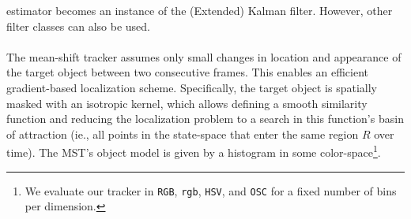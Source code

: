 \documentclass[a4paper,11pt]{article}
\begin{document}
		estimator becomes an instance of the (Extended) Kalman filter. However, other
		filter classes can also be used.
		\\ \\
		The mean-shift tracker assumes only small changes in location and appearance
		of the target object between two consecutive frames. This enables an efficient
		gradient-based localization scheme. Specifically, the target object is spatially
		masked with an isotropic kernel, which allows defining a smooth similarity function
		and reducing the localization problem to a search in this function's basin of attraction
		(ie., all points in the state-space that enter the same region $R$ over time). The MST's
		object model is given by a histogram in some color-space\footnote{We evaluate our tracker
		in \verb|RGB|, \verb|rgb|, \verb|HSV|, and \verb|OSC| for a fixed number of bins per
		dimension.}.
\end{document}
